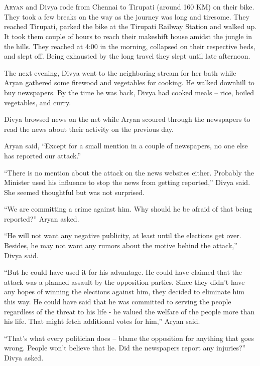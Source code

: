 \chapter{}
\lettrine{A}{ryan} and Divya rode from Chennai to Tirupati (around 160 KM) on their bike.
They took a few breaks on the way as the journey was long and tiresome. They
reached Tirupati, parked the bike at the Tirupati Railway Station and walked up.
It took them couple of hours to reach their makeshift house amidst the jungle in
the hills. They reached at 4:00 in the morning, collapsed on their respective
beds, and slept off. Being exhausted by the long travel they slept until late
afternoon.

The next evening, Divya went to the neighboring stream for her bath while Aryan
gathered some firewood and vegetables for cooking. He walked downhill to buy
newspapers. By the time he was back, Divya had cooked meals – rice, boiled
vegetables, and curry.

Divya browsed news on the net while Aryan scoured through the newspapers to read
the news about their activity on the previous day.

Aryan said, “Except for a small mention in a couple of newspapers, no one else
has reported our attack.”

“There is no mention about the attack on the news websites either. Probably the
Minister used his influence to stop the news from getting reported,” Divya said.
She seemed thoughtful but was not surprised.

“We are committing a crime against him. Why should he be afraid of that being
reported?” Aryan asked.

“He will not want any negative publicity, at least until the elections get over.
Besides, he may not want any rumors about the motive behind the attack,” Divya
said.

“But he could have used it for his advantage. He could have claimed that the
attack was a planned assault by the opposition parties. Since they didn't have
any hopes of winning the elections against him, they decided to eliminate him
this way. He could have said that he was committed to serving the people
regardless of the threat to his life - he valued the welfare of the people more
than his life. That might fetch additional votes for him,” Aryan said.

“That's what every politician does – blame the opposition for anything that goes
wrong. People won't believe that lie. Did the newspapers report any injuries?”
Divya asked.

